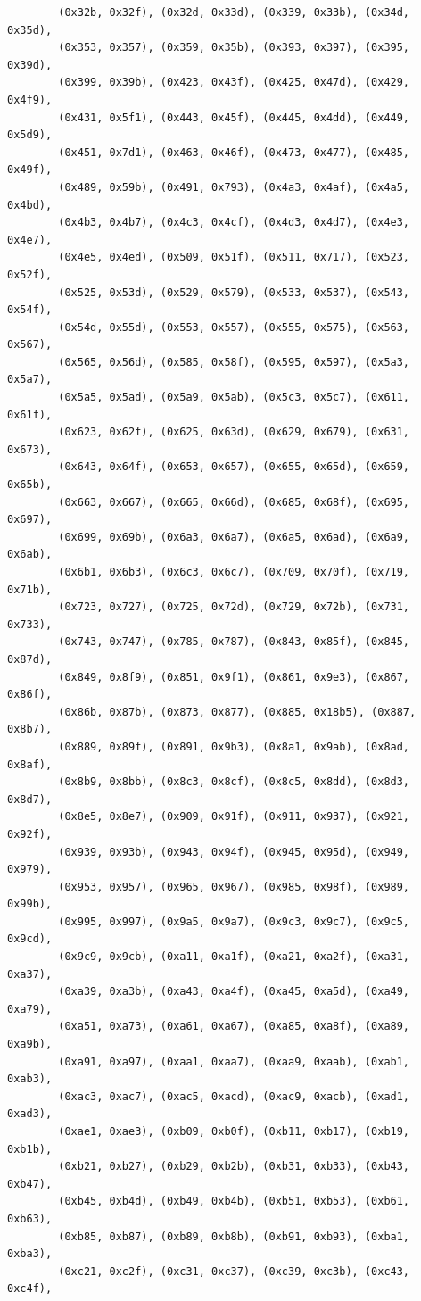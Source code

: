 \documentclass[11pt,a4paper]{article}
\begin{document}
\begin{lstlisting}
        (0x32b, 0x32f), (0x32d, 0x33d), (0x339, 0x33b), (0x34d, 0x35d),
        (0x353, 0x357), (0x359, 0x35b), (0x393, 0x397), (0x395, 0x39d),
        (0x399, 0x39b), (0x423, 0x43f), (0x425, 0x47d), (0x429, 0x4f9),
        (0x431, 0x5f1), (0x443, 0x45f), (0x445, 0x4dd), (0x449, 0x5d9),
        (0x451, 0x7d1), (0x463, 0x46f), (0x473, 0x477), (0x485, 0x49f),
        (0x489, 0x59b), (0x491, 0x793), (0x4a3, 0x4af), (0x4a5, 0x4bd),
        (0x4b3, 0x4b7), (0x4c3, 0x4cf), (0x4d3, 0x4d7), (0x4e3, 0x4e7),
        (0x4e5, 0x4ed), (0x509, 0x51f), (0x511, 0x717), (0x523, 0x52f),
        (0x525, 0x53d), (0x529, 0x579), (0x533, 0x537), (0x543, 0x54f),
        (0x54d, 0x55d), (0x553, 0x557), (0x555, 0x575), (0x563, 0x567),
        (0x565, 0x56d), (0x585, 0x58f), (0x595, 0x597), (0x5a3, 0x5a7),
        (0x5a5, 0x5ad), (0x5a9, 0x5ab), (0x5c3, 0x5c7), (0x611, 0x61f),
        (0x623, 0x62f), (0x625, 0x63d), (0x629, 0x679), (0x631, 0x673),
        (0x643, 0x64f), (0x653, 0x657), (0x655, 0x65d), (0x659, 0x65b),
        (0x663, 0x667), (0x665, 0x66d), (0x685, 0x68f), (0x695, 0x697),
        (0x699, 0x69b), (0x6a3, 0x6a7), (0x6a5, 0x6ad), (0x6a9, 0x6ab),
        (0x6b1, 0x6b3), (0x6c3, 0x6c7), (0x709, 0x70f), (0x719, 0x71b),
        (0x723, 0x727), (0x725, 0x72d), (0x729, 0x72b), (0x731, 0x733),
        (0x743, 0x747), (0x785, 0x787), (0x843, 0x85f), (0x845, 0x87d),
        (0x849, 0x8f9), (0x851, 0x9f1), (0x861, 0x9e3), (0x867, 0x86f),
        (0x86b, 0x87b), (0x873, 0x877), (0x885, 0x18b5), (0x887, 0x8b7),
        (0x889, 0x89f), (0x891, 0x9b3), (0x8a1, 0x9ab), (0x8ad, 0x8af),
        (0x8b9, 0x8bb), (0x8c3, 0x8cf), (0x8c5, 0x8dd), (0x8d3, 0x8d7),
        (0x8e5, 0x8e7), (0x909, 0x91f), (0x911, 0x937), (0x921, 0x92f),
        (0x939, 0x93b), (0x943, 0x94f), (0x945, 0x95d), (0x949, 0x979),
        (0x953, 0x957), (0x965, 0x967), (0x985, 0x98f), (0x989, 0x99b),
        (0x995, 0x997), (0x9a5, 0x9a7), (0x9c3, 0x9c7), (0x9c5, 0x9cd),
        (0x9c9, 0x9cb), (0xa11, 0xa1f), (0xa21, 0xa2f), (0xa31, 0xa37),
        (0xa39, 0xa3b), (0xa43, 0xa4f), (0xa45, 0xa5d), (0xa49, 0xa79),
        (0xa51, 0xa73), (0xa61, 0xa67), (0xa85, 0xa8f), (0xa89, 0xa9b),
        (0xa91, 0xa97), (0xaa1, 0xaa7), (0xaa9, 0xaab), (0xab1, 0xab3),
        (0xac3, 0xac7), (0xac5, 0xacd), (0xac9, 0xacb), (0xad1, 0xad3),
        (0xae1, 0xae3), (0xb09, 0xb0f), (0xb11, 0xb17), (0xb19, 0xb1b),
        (0xb21, 0xb27), (0xb29, 0xb2b), (0xb31, 0xb33), (0xb43, 0xb47),
        (0xb45, 0xb4d), (0xb49, 0xb4b), (0xb51, 0xb53), (0xb61, 0xb63),
        (0xb85, 0xb87), (0xb89, 0xb8b), (0xb91, 0xb93), (0xba1, 0xba3),
        (0xc21, 0xc2f), (0xc31, 0xc37), (0xc39, 0xc3b), (0xc43, 0xc4f),

\end{lstlisting}
\end{document}
